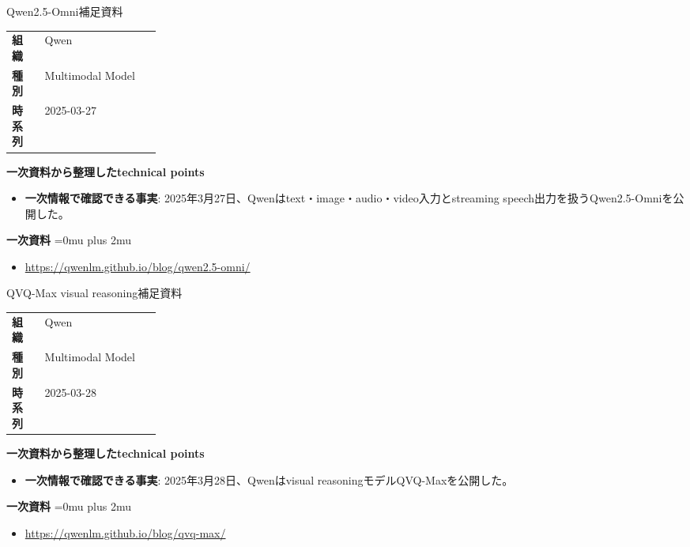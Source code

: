 \begin{technicalnote}{Qwen2.5-Omni}{補足資料}
\begingroup
\begin{tabularx}{\linewidth}{@{}>{\bfseries}p{0.22\linewidth}X@{}}
組織 & Qwen \\
種別 & Multimodal Model \\
時系列 & 2025-03-27 \\
\end{tabularx}
\smallskip
\begin{minipage}{\linewidth}
{\bfseries 一次資料から整理したtechnical points}
\begin{itemize}[leftmargin=1.5em,itemsep=0.35em]
\item \textbf{一次情報で確認できる事実}: 2025年3月27日、Qwenはtext・image・audio・video入力とstreaming speech出力を扱うQwen2.5-Omniを公開した。
\end{itemize}
\begin{samepage}
{\bfseries 一次資料}
\begingroup\sloppy
\Urlmuskip=0mu plus 2mu\relax
\begin{itemize}[leftmargin=1.5em,itemsep=0.25em]
\item {\scriptsize\url{https://qwenlm.github.io/blog/qwen2.5-omni/}}
\end{itemize}
\endgroup
\end{samepage}
\end{minipage}
\endgroup
\end{technicalnote}
\medskip

\begin{technicalnote}{QVQ-Max visual reasoning}{補足資料}
\begingroup
\begin{tabularx}{\linewidth}{@{}>{\bfseries}p{0.22\linewidth}X@{}}
組織 & Qwen \\
種別 & Multimodal Model \\
時系列 & 2025-03-28 \\
\end{tabularx}
\smallskip
\begin{minipage}{\linewidth}
{\bfseries 一次資料から整理したtechnical points}
\begin{itemize}[leftmargin=1.5em,itemsep=0.35em]
\item \textbf{一次情報で確認できる事実}: 2025年3月28日、Qwenはvisual reasoningモデルQVQ-Maxを公開した。
\end{itemize}
\begin{samepage}
{\bfseries 一次資料}
\begingroup\sloppy
\Urlmuskip=0mu plus 2mu\relax
\begin{itemize}[leftmargin=1.5em,itemsep=0.25em]
\item {\scriptsize\url{https://qwenlm.github.io/blog/qvq-max/}}
\end{itemize}
\endgroup
\end{samepage}
\end{minipage}
\endgroup
\end{technicalnote}
\medskip

